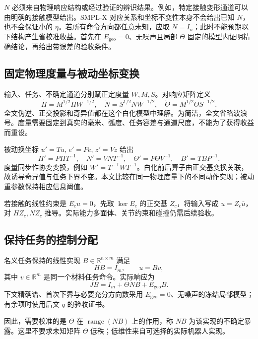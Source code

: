 \documentclass[11pt,a4paper]{article}
\numberwithin{equation}{section}
\theoremstyle{definition}
\begin{document}
$N$ 必须来自物理响应结构或经过验证的辨识结果。例如，特定接触变形通道可以由明确的接触模型给出。SMPL-X 对应关系和坐标不变性本身不会给出已知 $N$，也不会保证小的 $\eta$。若所有命令方向都任意未知，应取 $N=I_n$；此时不能预期以下结构产生省校准收益。首先在 $E_{\mathrm{geo}}=0$、无噪声且局部 $\Theta$ 固定的模型内证明精确结论，再给出带误差的验收条件。

\subsection{固定物理度量与被动坐标变换}

输入、任务、不确定通道分别赋正定度量 $W,M,S$。对响应矩阵定义
\begin{equation}
 \widetilde H=M^{1/2}HW^{-1/2},\quad
 \widetilde N=S^{1/2}NW^{-1/2},\quad
 \widetilde\Theta=M^{1/2}\Theta S^{-1/2}.
\end{equation}
全文伪逆、正交投影和奇异值都在这个白化模型中理解。为简洁，全文省略波浪号。度量需要固定到真实的毫米、弧度、任务容差与通道尺度，不能为了获得收益而重设。

被动换坐标 $u'=Tu$, $e'=Pe$, $z'=Vz$ 给出
\begin{equation}
 H'=PHT^{-1},\quad N'=VNT^{-1},\quad
 \Theta'=P\Theta V^{-1},\quad B'=TBP^{-1}.
\end{equation}
度量同步作协变变换，例如 $W'=T^{-\top}WT^{-1}$。白化前后算子由正交基变换关联，故诱导奇异值与任务下界不变。本文比较在同一物理度量下的不同动作实现；被动重参数保持相应信息阈值。

若接触的线性约束是 $E_cu=0$，先取 $\ker E_c$ 的正交基 $Z_c$，将输入写成 $u=Z_c\bar u$，对 $HZ_c,NZ_c$ 推导。实际能力多面体、关节约束和碰撞仍需后续验收。

\subsection{保持任务的控制分配}

名义任务保持的线性实现 $B\in\mathbb R^{n\times m}$ 满足
\begin{equation}
  HB=I_m,\qquad u=Bv ,
  \label{eq:cal-lift}
\end{equation}
其中 $v\in\mathbb R^m$ 是同一个材料任务命令。实际响应为
\begin{equation}
  JB=I_m+\Theta NB+E_{\mathrm{geo}}B .
  \label{eq:cal-exposure}
\end{equation}
下文精确谱、首次下界与必要充分方向数采用 $E_{\mathrm{geo}}=0$、无噪声的冻结局部模型；有余项时使用后文 $q$ 的验收证书。

因此，需要校准的是 $\Theta$ 在 $\operatorname{range}(NB)$ 上的作用，称 $NB$ 为该实现的不确定暴露。这里不要求未知矩阵 $\Theta$ 低秩；低维性来自可选择的实际机器人实现。
\end{document}
